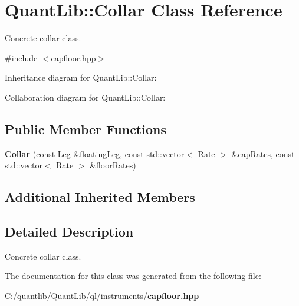 \section{Quant\+Lib\+:\+:Collar Class Reference}
\label{class_quant_lib_1_1_collar}


Concrete collar class.  




{\ttfamily \#include $<$capfloor.\+hpp$>$}



Inheritance diagram for Quant\+Lib\+:\+:Collar\+:


Collaboration diagram for Quant\+Lib\+:\+:Collar\+:
\subsection*{Public Member Functions}
\begin{DoxyCompactItemize}
\item 
{\bfseries Collar} (const Leg \&floating\+Leg, const std\+::vector$<$ Rate $>$ \&cap\+Rates, const std\+::vector$<$ Rate $>$ \&floor\+Rates)\label{class_quant_lib_1_1_collar_a6e3f3bed8c40916d4de6414b2fb7d109}

\end{DoxyCompactItemize}
\subsection*{Additional Inherited Members}


\subsection{Detailed Description}
Concrete collar class. 



The documentation for this class was generated from the following file\+:\begin{DoxyCompactItemize}
\item 
C\+:/quantlib/\+Quant\+Lib/ql/instruments/{\bf capfloor.\+hpp}\end{DoxyCompactItemize}
